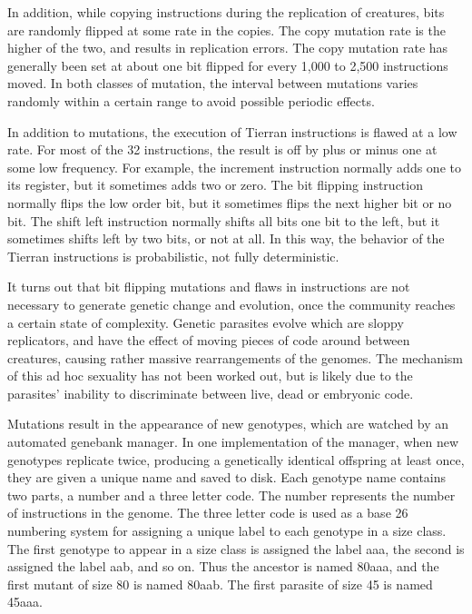 In addition, while copying instructions during the replication
of creatures, bits are randomly flipped at some rate in the copies.  The copy
mutation rate is the higher of the two, and results in replication errors.
The copy mutation rate has generally been set at about one bit flipped for
every 1,000 to 2,500 instructions moved.  In both classes of mutation,
the interval between mutations varies randomly within a certain range to
avoid possible periodic effects.

In addition to mutations, the execution of Tierran instructions is flawed
at a low rate.  For most of the 32 instructions, the result is off by plus
or minus one at some low frequency.  For example, the increment instruction
normally adds one to its register, but it sometimes adds two or zero.  The
bit flipping instruction normally flips the low order bit, but it sometimes
flips the next higher bit or no bit.  The shift left instruction normally
shifts all bits one bit to the left, but it sometimes shifts left by two
bits, or not at all.  In this way, the behavior of the Tierran instructions
is probabilistic, not fully deterministic.

It turns out that bit flipping mutations and flaws in instructions are not
necessary to generate genetic change and evolution, once the community
reaches a certain state of complexity.  Genetic parasites evolve which are
sloppy replicators, and have the effect of moving pieces of code around
between creatures, causing rather massive rearrangements of the genomes.
The mechanism of this ad hoc sexuality has not been worked out, but is
likely due to the parasites' inability to discriminate between live, dead
or embryonic code.

Mutations result in the appearance of new genotypes, which are watched
by an automated genebank manager.  In one implementation of the manager,
when new genotypes replicate twice, producing a genetically identical
offspring at least once, they are given a unique name and saved to disk.
Each genotype name contains two parts, a number and a three letter code.
The number represents the number of instructions in the genome.  The three
letter code is used as a base 26 numbering system for assigning a unique
label to each genotype in a size class.  The first genotype to appear in
a size class is assigned the label aaa, the second is assigned the label
aab, and so on.  Thus the ancestor is named 80aaa, and the first mutant
of size 80 is named 80aab.  The first parasite of size 45 is named 45aaa.

